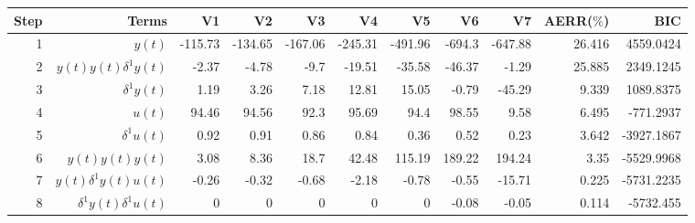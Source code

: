 \begin{tabular}{rrrrrrrrrrr}
Step & Terms & V1 & V2 & V3 & V4 & V5 & V6 & V7 & AERR($\%$) & BIC \\ 
\hline 
1 & $y(t)$ & -115.73 & -134.65 & -167.06 & -245.31 & -491.96 & -694.3 & -647.88 & 26.416 & 4559.0424 \\ 
2 & $y(t)y(t)\delta^1 y(t)$ & -2.37 & -4.78 & -9.7 & -19.51 & -35.58 & -46.37 & -1.29 & 25.885 & 2349.1245 \\ 
3 & $\delta^1 y(t)$ & 1.19 & 3.26 & 7.18 & 12.81 & 15.05 & -0.79 & -45.29 & 9.339 & 1089.8375 \\ 
4 & $u(t)$ & 94.46 & 94.56 & 92.3 & 95.69 & 94.4 & 98.55 & 9.58 & 6.495 & -771.2937 \\ 
5 & $\delta^1 u(t)$ & 0.92 & 0.91 & 0.86 & 0.84 & 0.36 & 0.52 & 0.23 & 3.642 & -3927.1867 \\ 
6 & $y(t)y(t)y(t)$ & 3.08 & 8.36 & 18.7 & 42.48 & 115.19 & 189.22 & 194.24 & 3.35 & -5529.9968 \\ 
7 & $y(t)\delta^1 y(t)u(t)$ & -0.26 & -0.32 & -0.68 & -2.18 & -0.78 & -0.55 & -15.71 & 0.225 & -5731.2235 \\ 
8 & $\delta^1 y(t)\delta^1 u(t)$ & 0 & 0 & 0 & 0 & 0 & -0.08 & -0.05 & 0.114 & -5732.455 \\ 
\hline 
\end{tabular}